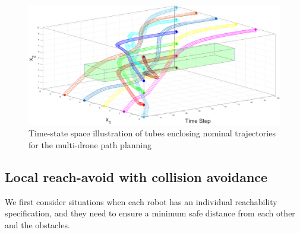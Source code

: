 %
\begin{figure}[t]
    \large
     \centering
         \includegraphics[width=\columnwidth]{figures/tr10_final.eps}
        \caption{Time-state space illustration of tubes enclosing nominal trajectories for the multi-drone path planning}
        \label{fig:3dtubes}
        \vspace{-.3cm}
\end{figure}

\subsection{Local reach-avoid with collision avoidance}
\label{sec:local reach-avoid}
%
We first consider situations when each robot has an individual reachability specification, 
and they need to ensure a minimum safe distance from each other and the obstacles.

